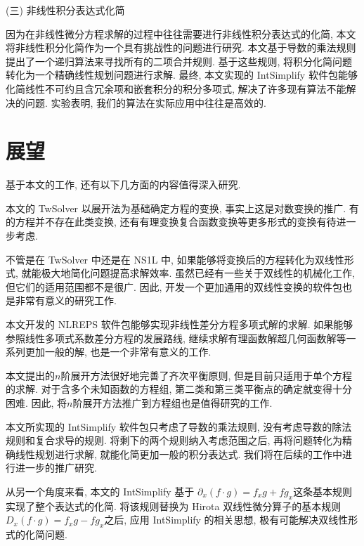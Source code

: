 (三) 非线性积分表达式化简

因为在非线性微分方程求解的过程中往往需要进行非线性积分表达式的化简, 本文将非线性积分化简作为一个具有挑战性的问题进行研究. 本文基于导数的乘法规则提出了一个递归算法来寻找所有的二项合并规则. 基于这些规则, 将积分化简问题转化为一个精确线性规划问题进行求解. 最终, 本文实现的 IntSimplify 软件包能够化简线性不可约且含冗余项和嵌套积分的积分多项式, 解决了许多现有算法不能解决的问题. 实验表明, 我们的算法在实际应用中往往是高效的. 

\section{展望}
基于本文的工作, 还有以下几方面的内容值得深入研究.
\begin{compactenum}[(1)]
\item 本文的 TwSolver 以\Painleve{}展开法为基础确定方程的变换, 事实上这是对数变换的推广. 有的方程并不存在此类变换, 还有有理变换\D 复合函数变换等更多形式的变换有待进一步考虑.
\item 不管是在 TwSolver 中还是在 NS1L 中, 如果能够将变换后的方程转化为双线性形式, 就能极大地简化问题\D 提高求解效率. 虽然已经有一些关于双线性的机械化工作, 但它们的适用范围都不是很广. 因此, 开发一个更加通用的双线性变换的软件包也是非常有意义的研究工作.
\item 本文开发的 NLREPS 软件包能够实现非线性差分方程多项式解的求解. 如果能够参照线性多项式系数差分方程的发展路线, 继续求解有理函数解\D 超几何函数解等一系列更加一般的解, 也是一个非常有意义的工作. 
\item 本文提出的$n$阶展开方法很好地完善了齐次平衡原则, 但是目前只适用于单个方程的求解. 对于含多个未知函数的方程组, 第二类和第三类平衡点的确定就变得十分困难. 因此, 将$n$阶展开方法推广到方程组也是值得研究的工作.
\item 本文所实现的 IntSimplify 软件包只考虑了导数的乘法规则, 没有考虑导数的除法规则和复合求导的规则. 将剩下的两个规则纳入考虑范围之后, 再将问题转化为精确线性规划进行求解, 就能化简更加一般的积分表达式. 我们将在后续的工作中进行进一步的推广研究. 
\item 从另一个角度来看, 本文的 IntSimplify 基于 $\partial_x (f\cdot g)=f_xg+fg_x$这条基本规则实现了整个表达式的化简. 将该规则替换为 Hirota 双线性微分算子的基本规则$D_x(f\cdot g)=f_xg-fg_x$之后, 应用 IntSimplify 的相关思想, 极有可能解决双线性形式的化简问题.
\end{compactenum}
